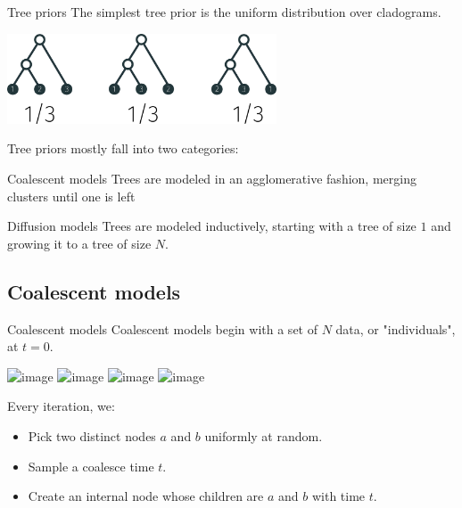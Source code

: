 \documentclass[10pt, compress]{beamer}
\begin{document}
\begin{frame}{Tree priors}
  The simplest tree prior is the uniform distribution over
  cladograms.

  \pause

  \begin{center}
    \includegraphics[width=0.6\textwidth]{img/uniform-distribution}
  \end{center}

  \pause

  Tree priors mostly fall into two categories:
  \pause
  \begin{block}{Coalescent models}
    Trees are modeled in an
      agglomerative fashion, merging clusters until 
      one is left
    \end{block}
  \pause
  \begin{block}{Diffusion models}
    Trees are modeled inductively,
      starting with a tree of size $1$ and growing it to
      a tree of size $N$.
    \end{block}
\end{frame}

\subsection{Coalescent models}

\begin{frame}{Coalescent models}
  Coalescent models begin with a set of $N$
  data, or "individuals", at $t = 0$.

  \begin{center}
    \includegraphics<1>[width=0.5\textwidth]{img/coalescent-1}
    \includegraphics<2>[width=0.5\textwidth]{img/coalescent-2}
    \includegraphics<3>[width=0.5\textwidth]{img/coalescent-3}
    \includegraphics<4>[width=0.5\textwidth]{img/coalescent-4}
  \end{center}

  \pause

  Every iteration, we:
  \begin{itemize}
    \item Pick two distinct nodes $a$ and $b$ uniformly at random.
    \item Sample a coalesce time $t$.
    \item Create an internal node whose children are $a$ and $b$
      with time $t$.
  \end{itemize}
\end{frame}
\end{document}
